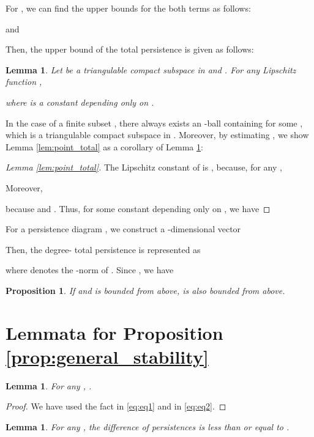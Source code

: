 \documentclass{article}
\newtheorem{lem}[thm]{Lemma}
\newtheorem{prop}[thm]{Proposition}
\begin{document}
For , we can find the upper bounds for the both terms as follows:

and

Then, the upper bound of the total persistence  is given as follows:
\begin{lem}
\label{lem:total}
Let  be a triangulable compact subspace in  and .
For any Lipschitz function , 

where  is a constant depending only on .
\end{lem}

In the case of a finite subset , there always exists an -ball  containing  for some , which is a triangulable compact subspace in .
Moreover, by estimating , we show Lemma \ref{lem:point_total} as a corollary of Lemma \ref{lem:total}:

\begin{proof}[Lemma \ref{lem:point_total}]
The Lipschitz constant of  is , because, for any ,

Moreover, 

because  and .
Thus, for some constant  depending only on ,  we have

\end{proof}

For a persistence diagram , we construct a -dimensional vector

Then, the degree- total persistence is represented as 

where  denotes the -norm of .
Since , we have


\begin{prop}
\label{prop:persistence_inequality}
If  and  is bounded from above,  is also bounded from above.
\end{prop}



\section{Lemmata for Proposition \ref{prop:general_stability}}
\label{sec:stability}

\begin{lem}
\label{lemm:Lip_k}
For any , .
\end{lem}

\begin{proof}

We have used the fact  in \eqref{eq:eq1} and  in \eqref{eq:eq2}.
\end{proof}

\begin{lem}
\label{lemm:persistence}
For any , the difference of persistences  is less than or equal to .
\end{lem}
\end{document}
